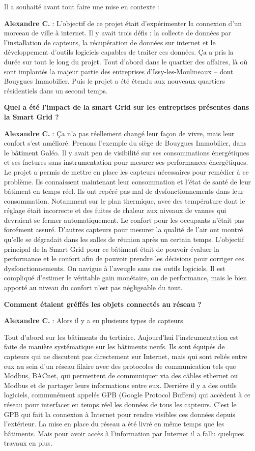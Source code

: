 Il a souhaité avant tout faire une mise en contexte :

\textbf{Alexandre C.} :
L'objectif de ce projet était d’expérimenter la connexion d’un morceau de ville à internet.
Il y avait trois défis : la collecte de données par l’installation de capteurs,
la récupération de données sur internet et le développement d’outils logiciels capables de traiter ces données.
Ça a pris la durée sur tout le long du projet. Tout d’abord dans le quartier des affaires,
là où sont implantés la majeur partie des entreprises d'Issy-les-Moulineaux – dont Bouygues Immobilier.
Puis le projet a été étendu aux nouveaux quartiers résidentiels dans un second temps.

\textbf{Quel a été l’impact de la smart Grid sur les entreprises présentes dans la Smart Grid ?}

\textbf{Alexandre C.} :
Ça n’a pas réellement changé leur façon de vivre, mais leur confort s'est amélioré.
Prenons l'exemple du siège de Bouygues Immobilier, dans le bâtiment Galéo.
Il y avait peu de visibilité sur ses consommations énergétiques
et ses factures sans instrumentation pour mesurer ses performances énergétiques.
Le projet a permis de mettre en place les capteurs nécessaires pour remédier à ce problème.
Ils connaissent maintenant leur consommation et l’état de santé de leur bâtiment en temps réel.
Ils ont repéré pas mal de dysfonctionnements dans leur consommation.
Notamment sur le plan thermique, avec des température dont le réglage était incorrecte
et des fuites de chaleur aux niveaux de vannes qui devraient se fermer automatiquement.
Le confort pour les occupants n’était pas forcément assuré.
D'autres capteurs pour mesurer la qualité de l’air ont montré qu'elle se dégradait dans les salles de réunion après un certain temps.
L’objectif principal de la Smart Grid pour ce bâtiment était de pouvoir évaluer la performance
et le confort afin de pouvoir prendre les décisions pour corriger ces dysfonctionnements.
On navigue à l’aveugle sans ces outils logiciels.
Il est compliqué d’estimer le véritable gain monétaire, ou de performance,
mais le bien apporté au niveau du confort n’est pas négligeable du tout.

\textbf{Comment étaient gréffés les objets connectés au réseau ?}

\textbf{Alexandre C.} :
Alors il y a eu plusieurs types de capteurs.

Tout d’abord sur les bâtiments du tertiaire.
Aujourd’hui l’instrumentation est faite de manière systématique sur les bâtiments neufs.
Ils sont équipés de capteurs qui ne discutent pas directement sur Internet,
mais qui sont reliés entre eux au sein d’un réseau filaire avec des protocoles de communication
tels que Modbus, BACnet, qui permettent de communiquer via des câbles ethernet ou Modbus
et de partager leurs informations entre eux.
Derrière il y a des outils logiciels, communément appelés GPB (Google Protocol Buffers) qui accèdent à ce réseau
pour interfacer en temps réel les données de tous les capteurs.
C'est le GPB qui fait la connexion à Internet pour rendre visibles ces données depuis l'extérieur.
La mise en place du réseau a été livré en même temps que les bâtiments.
Mais pour avoir accès à l’information par Internet il a fallu quelques travaux en plus.

